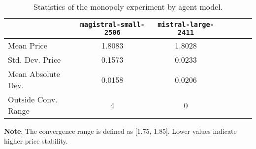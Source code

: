 \begin{table}[H]
\centering
\caption{Statistics of the monopoly experiment by agent model.}
\label{tab:monopoly_stats}
\begin{tabular}{lcccccc}
\toprule
 & \texttt{magistral-small-2506} & \texttt{mistral-large-2411} \\
\midrule
Mean Price & 1.8083 & 1.8028 \\
Std. Dev. Price & 0.1573 & 0.0233 \\
Mean Absolute Dev. & 0.0158 & 0.0206 \\
Outside Conv. Range & 4 & 0 \\
\bottomrule
\end{tabular}

\vspace{0.5em}
\footnotesize{\parbox{1\textwidth}{\textbf{Note}: The convergence range is defined as [1.75, 1.85]. Lower values indicate higher price stability.}}


\end{table}
